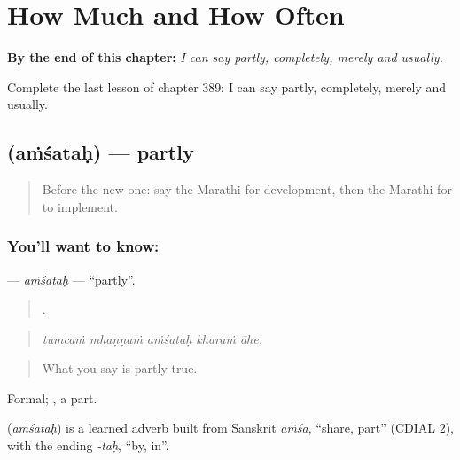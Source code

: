 
\chapter{How Much and How Often}
\label{ch:mr-how-much-and-how-often}

\begin{chapteropening}
\textbf{By the end of this chapter:} \emph{I can say partly, completely, merely and usually.}

Complete the last lesson of chapter 389: I can say partly, completely, merely and usually.
\end{chapteropening}

\section[\texorpdfstring{\mr{अंशतः} (aṁśataḥ)}{अंशतः (aṁśataḥ)}]{ (aṁśataḥ) — partly}

\label{lesson:MR-C389-amsatah}



\begin{quote}
Before the new one: say the Marathi for development, then the Marathi for to implement.
\end{quote}

\subsection*{You'll want to know: }
\textbf{} — \emph{aṁśataḥ} — \textquotedblleft{}partly\textquotedblright{}.

\begin{quote}
    .
\end{quote}

\begin{quote}
\emph{tumcaṁ mhaṇṇaṁ aṁśataḥ kharaṁ āhe.}
\end{quote}

\begin{quote}
What you say is partly true.
\end{quote}

Formal; , a part.

\begin{cousinweb}
\textbf{} (\emph{aṁśataḥ}) is a learned adverb built from Sanskrit \emph{aṁśa}, \textquotedblleft{}share, part\textquotedblright{} (CDIAL 2), with the ending \emph{-taḥ}, \textquotedblleft{}by, in\textquotedblright{}.
\end{cousinweb}

